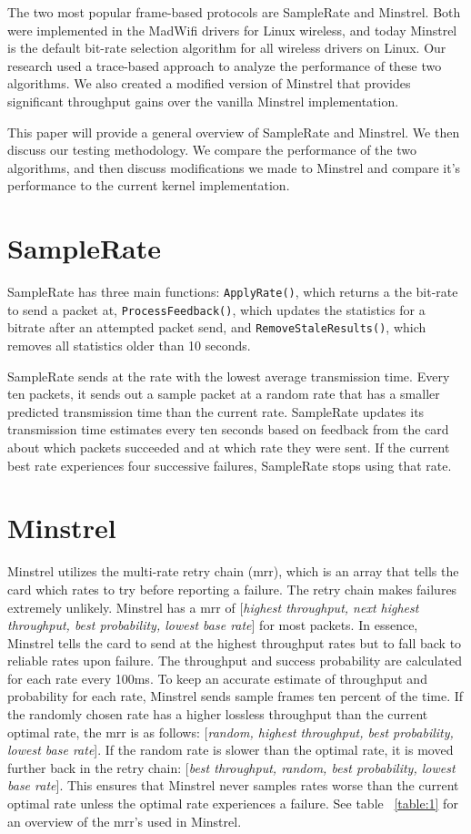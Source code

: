 \documentclass[letterpaper,twocolumn,10pt]{article}
\begin{document}
The two most popular frame-based protocols are SampleRate and Minstrel. Both were implemented in the MadWifi drivers for Linux wireless, and today Minstrel is the default bit-rate selection algorithm for all wireless drivers on Linux. Our research used a trace-based approach to analyze the performance of these two algorithms. We also created a modified version of Minstrel that provides significant throughput gains over the vanilla Minstrel implementation. 

This paper will provide a general overview of SampleRate and Minstrel. We then discuss our testing methodology. We compare the performance of the two algorithms, and then discuss modifications we made to Minstrel and compare it's performance to the current kernel implementation.
\section{SampleRate}

SampleRate has three main functions: \texttt{ApplyRate()}, which returns a the bit-rate to send a packet at, \texttt{ProcessFeedback()}, which updates the statistics for a bitrate after an attempted packet send,  and \texttt{RemoveStaleResults()}, which removes all statistics older than 10 seconds.

SampleRate sends at the rate with the lowest average transmission time. Every ten packets, it sends out a sample packet at a random rate that has a smaller predicted transmission time than the current rate. SampleRate updates its transmission time estimates every ten seconds based on feedback from the card about which packets succeeded and at which rate they were sent. If the current best rate experiences four successive failures, SampleRate stops using that rate. 

\section{Minstrel}

Minstrel utilizes the multi-rate retry chain (mrr), which is an array that tells the card which rates to try before reporting a failure. The retry chain makes failures extremely unlikely. Minstrel has a mrr of [\emph{highest throughput, next highest throughput, best probability, lowest base rate}] for most packets. In essence, Minstrel tells the card to send at the highest throughput rates but to fall back to reliable rates upon failure. The throughput and success probability are calculated for each rate every 100ms. 
To keep an accurate estimate of throughput and probability for each rate, Minstrel sends sample frames ten percent of the time. If the randomly chosen rate has a higher lossless throughput than the current optimal rate, the mrr is as follows: [\emph{random, highest throughput, best probability, lowest base rate}]. If the random rate is slower than the optimal rate, it is moved further back in the retry chain: [\emph{best throughput, random, best probability, lowest base rate}]. This ensures that Minstrel never samples rates worse than the current optimal rate unless the optimal rate experiences a failure. See table ~\ref{table:1} for an overview of the mrr's used in Minstrel.
\end{document}
